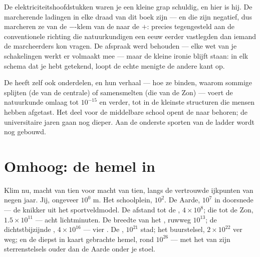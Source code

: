 \begin{example}\label{ex:g9:atoms-to-galaxies:electron}
De elektriciteitshoofdstukken waren je een kleine grap schuldig, en
hier is hij. De marcherende ladingen in elke draad van dit boek zijn
\emph{} --- en die zijn negatief, dus marcheren ze van
de $-$-klem van de  naar de $+$: precies
tegengesteld aan de conventionele richting die natuurkundigen een eeuw
eerder vastlegden dan iemand de marcheerders kon vragen. De afspraak
werd behouden --- elke wet van je schakelingen werkt er volmaakt mee ---
maar de kleine ironie blijft staan: in elk schema dat je hebt getekend,
loopt de echte menigte de andere kant op.
\end{example}

\begin{example}\label{ex:g9:atoms-to-galaxies:deeper}
De  heeft zelf ook onderdelen, en hun verhaal --- hoe ze
binden, waarom sommige  splijten (de  van de
centrale) of samensmelten (die van de Zon) --- voert de natuurkunde
omlaag tot $10^{-15}$  en verder, tot in de kleinste
structuren die mensen hebben afgetast. Het deel voor de middelbare
school opent de  naar behoren; de universitaire jaren gaan
nog dieper. Aan de onderste sporten van de ladder wordt nog gebouwd.
\end{example}

\section{Omhoog: de hemel in}

\begin{example}[De klim]\label{ex:g9:atoms-to-galaxies:ascent}
Klim nu, macht van tien voor macht van tien, langs de vertrouwde
ijkpunten van negen jaar. Jij, ongeveer $10^{0}$ \unit{m}. Het
schoolplein, $10^{2}$. De Aarde, $10^{7}$ in doorsnede --- de knikker
uit het sportveldmodel. De afstand tot de , $4 \times
10^{8}$; die tot de Zon, $1.5 \times 10^{11}$ --- acht lichtminuten. De
breedte van het , ruwweg $10^{13}$; de
dichtstbijzijnde , $4 \times 10^{16}$ --- vier
. De , $10^{21}$
 stad; het buurstelsel, $2 \times 10^{22}$ ver weg; en de
diepst in kaart gebrachte hemel, rond $10^{26}$  --- met het
 van zijn sterrenstelsels ouder dan de Aarde onder je stoel.
\end{example}

